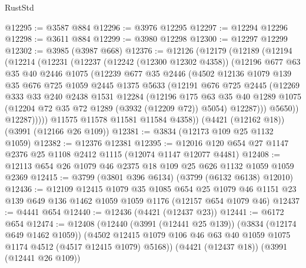 \begin{lexlean}{RustStd}
\begin{coremodule}
@12295 := @3587 @884
@12296 := @3976 @12295
@12297 := @12294 @12296
@12298 := @3611 @884
@12299 := @3980 @12298
@12300 := @12297 @12299
@12302 := @3985 (@3987 @668)
@12376 := @12126
    (@12179
      (@12189
        (@12194
          (@12214
            (@12231
              (@12237
                (@12242 (@12300 @12302 @4358))
                (@12196
                  @677
                  @63
                  @35
                  @40
                  @2446
                  @1075
                  (@12239
                    @677
                    @35
                    @2446
                    (@4502
                      @12136
                      @1079
                      @139
                      @35
                      @676
                      @725
                      @1059
                      @2445
                      @1375
                      @5633
                      (@12191
                        @676
                        @725
                        @2445
                        (@12269
                          @333
                          @33
                          @240
                          @2438
                          @1531
                          @12284
                          (@12196
                            @175
                            @63
                            @35
                            @40
                            @1289
                            @1075
                            (@12204 @72 @35 @72 @1289 (@3932 (@12209 @72)) @5054)
                            @12287)))
                      @5650))
                  @12287)))))
        @11575
        @11578
        @11581
        @11584
        @4358))
    (@4421 (@12162 @18))
    (@3991 (@12166 @26 @109))
@12381 := @3834 (@12173 @109 @25 @1132 @1059)
@12382 := @12376 @12381
@12395 := @12016 @120 @654 @27 @1147 @2376 @25 @1108 @2412 @1115 (@12074 @1147 @12077 @4481)
@12408 := @12113 @654 @26 @1079 @46 @2375 @18 @109 @25 @626 @1132 @1059 @1059 @2369
@12415 := @3799 (@3801 @396 @6134) (@3799 (@6132 @6138) @12010)
@12436 := @12109
    @12415
    @1079
    @35
    @1085
    @654
    @25
    @1079
    @46
    @1151
    @23
    @139
    @649
    @136
    @1462
    @1059
    @1059
    @1176
    (@12157 @654 @1079 @46)
@12437 := @4441 @654
@12440 := @12436 (@4421 (@12437 @23))
@12441 := @6172 @654
@12474 := @12408
    (@12440
      (@3991 (@12441 @25 @139))
      (@3834 (@12174 @649 @1462 @1059))
      (@4502 @12415 @1079 @106 @46 @63 @40 @1059 @1075 @1174 @4512 (@4517 @12415 @1079) @5168))
    (@4421 (@12437 @18))
    (@3991 (@12441 @26 @109))

\end{coremodule}
\end{lexlean}
